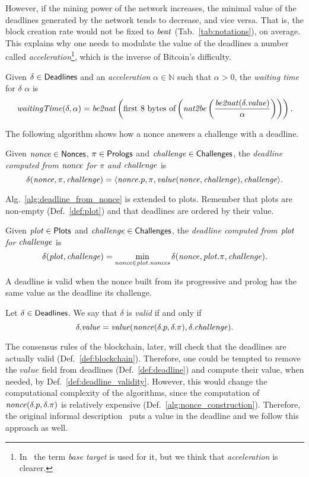 However, if the mining power of the network increases, the minimal value of the deadlines
generated by the network
tends to decrease, and vice versa. That is, the block creation rate would not be
fixed to ${\mathit{beat}}$ (Tab.~\ref{tab:notations}), on average.
This explains why one needs to modulate the value of the deadlines \wrt a number
called \emph{acceleration}\footnote{In~\cite{SignumPlotting} the term
\emph{base target} is used for it, but we think that \emph{acceleration} is clearer.},
which is the inverse of Bitcoin's difficulty.
%
\begin{definition}\label{def:deadline_waiting_time}
  Given $\delta\in{\mathsf{Deadlines}}$ and an \emph{acceleration}
  $\alpha\in\mathbb{N}$ such that $\alpha>0$, the
  \emph{waiting time} for $\delta$ \wrt $\alpha$ is
  \[
  {\mathit{waitingTime}}(\delta,\alpha)
  ={\mathit{be2nat}}\left(\text{first $8$ bytes of}\left({\mathit{nat2be}}\left(\frac{{\mathit{be2nat}}(\delta.\mathit{value})}{\alpha}\right)\right)\right).
  \]
\end{definition}
%
The following algorithm shows how a nonce answers a challenge with a deadline.
%
\begin{alg}[$\delta(\nonce,\pi,\challenge)$]\label{alg:deadline_from_nonce}
  Given ${\mathit{nonce}}\in{\mathsf{Nonces}}$, $\pi\in{\mathsf{Prologs}}$ and ${\mathit{challenge}}\in{\mathsf{Challenges}}$, the
  \emph{deadline computed from ${\mathit{nonce}}$ for $\pi$ and ${\mathit{challenge}}$} is
  \[
  \delta({\mathit{nonce}},\pi,{\mathit{challenge}})=\langle{\mathit{nonce}}.p,\pi,\mathit{value}({\mathit{nonce}},{\mathit{challenge}}),{\mathit{challenge}}\rangle.
  \]
\end{alg}
%
Alg.~\ref{alg:deadline_from_nonce} is extended to plots. Remember that plots are non-empty
(Def.~\ref{def:plot}) and that deadlines are ordered by their value.
%
\begin{alg}[$\deadline(\plot,\challenge)$]\label{alg:deadline_from_plot}
  Given ${\mathit{plot}}\in{\mathsf{Plots}}$ and ${\mathit{challenge}}\in{\mathsf{Challenges}}$, the \emph{deadline computed
  from ${\mathit{plot}}$ for ${\mathit{challenge}}$} is
  \[
  \delta({\mathit{plot}},{\mathit{challenge}})=\min\limits_{{\mathit{nonce}}\in{\mathit{plot}}.{\mathit{nonces}}}\delta({\mathit{nonce}},{\mathit{plot}}.\pi,{\mathit{challenge}}).
  \]
\end{alg}
%
A deadline is valid when the nonce built from its progressive and prolog
has the same value as the deadline \wrt its challenge.
%
\begin{definition}\label{def:deadline_validity}
  Let $\delta\in{\mathsf{Deadlines}}$. We say that $\delta$ is \emph{valid} if and only if
  \[
  \delta.\mathit{value}=\mathit{value}({\mathit{nonce}}(\delta.p,\delta.\pi),\delta.{\mathit{challenge}}).
  \]
\end{definition}
%
The consensus rules of the blockchain, later, will check that the deadlines are
actually valid (Def.~\ref{def:blockchain}). Therefore, one could be tempted to
remove the $\mathit{value}$ field from deadlines (Def.~\ref{def:deadline}) and compute
their value, when needed, by Def.~\ref{def:deadline_validity}. However, this would change the
computational complexity of the algorithms, since the computation of
${\mathit{nonce}}(\delta.p,\delta.\pi)$ is relatively expensive (Def.~\ref{alg:nonce_construction}).
Therefore, the original informal description~\cite{SignumPlotting} puts a value in the deadline
and we follow this approach as well.
